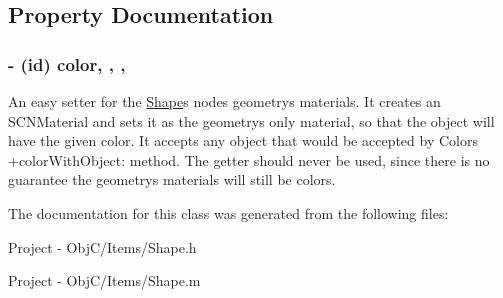\subsection{Property Documentation}
\hypertarget{interface_shape_ab8fb9fc905556ecc76ad3d3df884793a}{}
\subsubsection[{color}]{\setlength{\rightskip}{0pt plus 5cm}-\/ (id) color\hspace{0.3cm}{\ttfamily [read]}, {\ttfamily [write]}, {\ttfamily [nonatomic]}, {\ttfamily [strong]}}\label{interface_shape_ab8fb9fc905556ecc76ad3d3df884793a}
An easy setter for the {\ttfamily \hyperlink{interface_shape}{Shape}\textquotesingle{}s} {\ttfamily node\textquotesingle{}s} {\ttfamily geometry\textquotesingle{}s} {\ttfamily materials}. It creates an {\ttfamily S\+C\+N\+Material} and sets it as the {\ttfamily geometry\textquotesingle{}s} only {\ttfamily material}, so that the object will have the given {\ttfamily color}. It accepts any object that would be accepted by {\ttfamily Color\textquotesingle{}s} {\ttfamily +color\+With\+Object}\+: method. The getter should never be used, since there is no guarantee the geometry\textquotesingle{}s materials will still be colors. 

The documentation for this class was generated from the following files\+:\begin{DoxyCompactItemize}
\item 
Project -\/ Obj\+C/\+Items/Shape.\+h\item 
Project -\/ Obj\+C/\+Items/Shape.\+m\end{DoxyCompactItemize}
